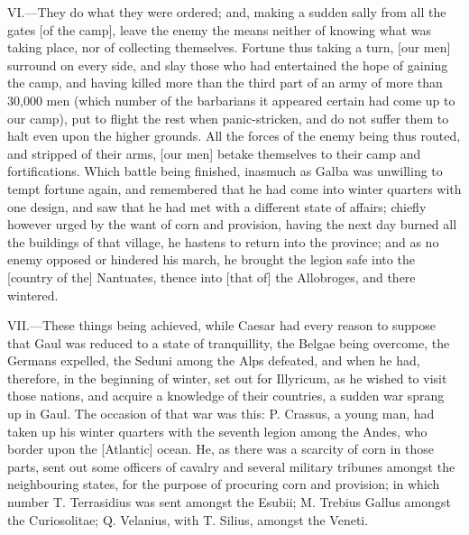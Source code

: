 VI.—They do what they were ordered; and, making a sudden sally from all
the gates [of the camp], leave the enemy the means neither of knowing
what was taking place, nor of collecting themselves. Fortune thus taking
a turn, [our men] surround on every side, and slay those who had
entertained the hope of gaining the camp, and having killed more than
the third part of an army of more than 30,000 men (which number of the
barbarians it appeared certain had come up to our camp), put to flight
the rest when panic-stricken, and do not suffer them to halt even upon
the higher grounds. All the forces of the enemy being thus routed, and
stripped of their arms, [our men] betake themselves to their camp and
fortifications. Which battle being finished, inasmuch as Galba was
unwilling to tempt fortune again, and remembered that he had come into
winter quarters with one design, and saw that he had met with a
different state of affairs; chiefly however urged by the want of corn
and provision, having the next day burned all the buildings of that
village, he hastens to return into the province; and as no enemy opposed
or hindered his march, he brought the legion safe into the [country of
the] Nantuates, thence into [that of] the Allobroges, and there
wintered.

VII.—These things being achieved, while Caesar had every reason to
suppose that Gaul was reduced to a state of tranquillity, the Belgae
being overcome, the Germans expelled, the Seduni among the Alps
defeated, and when he had, therefore, in the beginning of winter, set
out for Illyricum, as he wished to visit those nations, and acquire a
knowledge of their countries, a sudden war sprang up in Gaul. The
occasion of that war was this: P. Crassus, a young man, had taken up his
winter quarters with the seventh legion among the Andes, who border upon
the [Atlantic] ocean. He, as there was a scarcity of corn in those
parts, sent out some officers of cavalry and several military tribunes
amongst the neighbouring states, for the purpose of procuring corn and
provision; in which number T. Terrasidius was sent amongst the Esubii;
M. Trebius Gallus amongst the Curiosolitae; Q. Velanius, with T. Silius,
amongst the Veneti.

